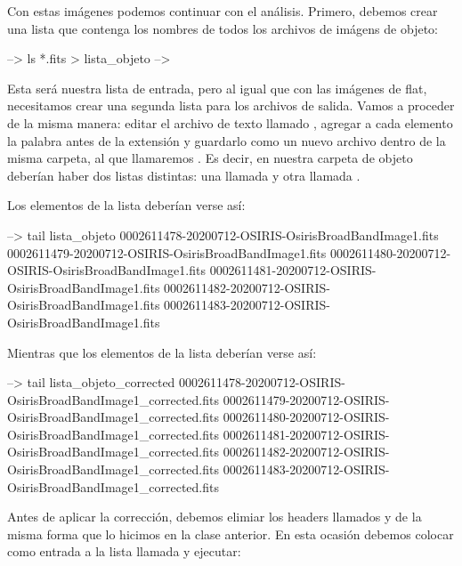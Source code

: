 Con estas imágenes podemos continuar con el análisis. Primero, debemos crear una lista que contenga los nombres de todos los archivos de imágens de objeto:

\begin{shell}
--> ls *.fits > lista_objeto
-->
\end{shell}

Esta será nuestra lista de entrada, pero al igual que con las imágenes de flat, necesitamos crear una segunda lista para los archivos de salida. Vamos a proceder de la misma manera: editar el archivo de texto llamado , agregar a cada elemento la palabra  antes de la extensión  y guardarlo como un nuevo archivo dentro de la misma carpeta, al que llamaremos . Es decir, en nuestra carpeta de objeto deberían haber dos listas distintas: una llamada  y otra llamada . 

Los elementos de la lista  deberían verse así:
\begin{shell}
--> tail lista_objeto
0002611478-20200712-OSIRIS-OsirisBroadBandImage1.fits
0002611479-20200712-OSIRIS-OsirisBroadBandImage1.fits
0002611480-20200712-OSIRIS-OsirisBroadBandImage1.fits
0002611481-20200712-OSIRIS-OsirisBroadBandImage1.fits
0002611482-20200712-OSIRIS-OsirisBroadBandImage1.fits
0002611483-20200712-OSIRIS-OsirisBroadBandImage1.fits

\end{shell}

Mientras que los elementos de la lista  deberían verse así:

\begin{shell}
--> tail lista_objeto_corrected
0002611478-20200712-OSIRIS-OsirisBroadBandImage1_corrected.fits
0002611479-20200712-OSIRIS-OsirisBroadBandImage1_corrected.fits
0002611480-20200712-OSIRIS-OsirisBroadBandImage1_corrected.fits
0002611481-20200712-OSIRIS-OsirisBroadBandImage1_corrected.fits
0002611482-20200712-OSIRIS-OsirisBroadBandImage1_corrected.fits
0002611483-20200712-OSIRIS-OsirisBroadBandImage1_corrected.fits
\end{shell}

Antes de aplicar la corrección, debemos elimiar los headers llamados  y  de la misma forma que lo hicimos en la clase anterior. En esta ocasión debemos colocar como entrada a la lista llamada  y ejecutar:

